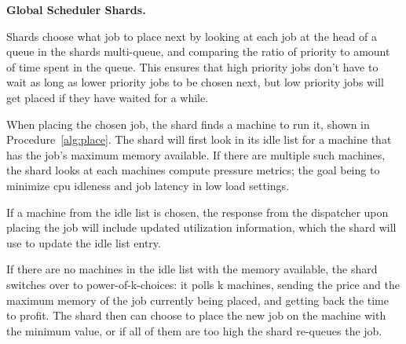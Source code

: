 \textbf{Global Scheduler Shards.}

Shards choose what job to place next by looking at each job at the head of a
queue in the shards multi-queue, and comparing the ratio of priority to amount
of time spent in the queue. This ensures that high priority jobs don't have to
wait as long as lower priority jobs to be chosen next, but low priority jobs
will get placed if they have waited for a while.

When placing the chosen job, the shard finds a machine to run it, shown in
Procedure~\ref{alg:place}. The shard will first look in its idle list for a
machine that has the job's maximum memory available. If there are multiple such
machines, the shard looks at each machines compute pressure metrics; the goal
being to minimize cpu idleness and job latency in low load
settings. 

If a machine from the idle list is chosen, the response from the dispatcher upon
placing the job will include updated utilization information, which the shard
will use to update the idle list entry.

If there are no machines in the idle list with the memory available, the shard
switches over to power-of-k-choices: it polls k machines, sending the price and
the maximum memory of the job currently being placed, and getting back the time
to profit. The shard then can choose to place the new job on the machine with
the minimum value, or if all of them are too high the shard re-queues the job.
